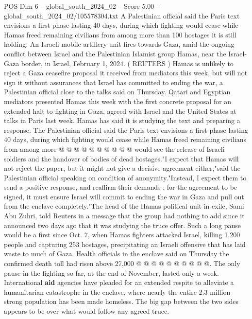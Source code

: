 \begin{textsample}{POS Dim 6 – global\_south\_2024\_02 – Score 5.00 – global\_south\_2024\_02/105578304.txt}  \label{ex:f6_pos_162}
A Palestinian official said the Paris text envisions a first phase lasting 40 days, during which fighting would cease while Hamas freed remaining civilians from among more than 100 hostages it is still holding.
An Israeli mobile artillery unit fires towards Gaza, amid the ongoing conflict between Israel and the Palestinian Islamist group Hamas, near the Israel-Gaza border, in Israel, February 1, 2024. ( REUTERS ) Hamas is unlikely to reject a Gaza ceasefire proposal it received from mediators this week, but will not sign it without assurances that Israel has committed to ending the war, a Palestinian official close to the talks said on Thursday.
Qatari and Egyptian mediators presented Hamas this week with the first concrete proposal for an extended halt to fighting in Gaza, agreed with Israel and the United States at talks in Paris last week.
Hamas has said it is studying the text and preparing a response.
The Palestinian official said the Paris text envisions a first phase lasting 40 days, during which fighting would cease while Hamas freed remaining civilians from among more @ @ @ @ @ @ @ @ @ @ would see the release of Israeli soldiers and the handover of bodies of dead hostages."I expect that Hamas will not reject the paper, but it might not give a decisive agreement either,"said the Palestinian official speaking on condition of anonymity."Instead, I expect them to send a positive response, and reaffirm their demands : for the agreement to be signed, it must ensure Israel will commit to ending the war in Gaza and pull out from the enclave completely."The head of the Hamas political unit in exile, Sami Abu Zuhri, told Reuters in a message that the group had nothing to add since it announced two days ago that it was studying the truce offer.
Such a long pause would be a first since Oct. 7, when Hamas fighters attacked Israel, killing 1,200 people and capturing 253 hostages, precipitating an Israeli offensive that has laid waste to much of Gaza.
Health officials in the enclave said on Thursday the confirmed death toll had risen above 27,000 @ @ @ @ @ @ @ @ @ @.
The only pause in the fighting so far, at the end of November, lasted only a week.
International \textbf{aid} agencies have pleaded for an extended respite to alleviate a humanitarian catastrophe in the enclave, where nearly the entire 2.3 million-strong population has been made homeless.
The big gap between the two sides appears to be over what would follow any agreed truce.

\end{textsample}
